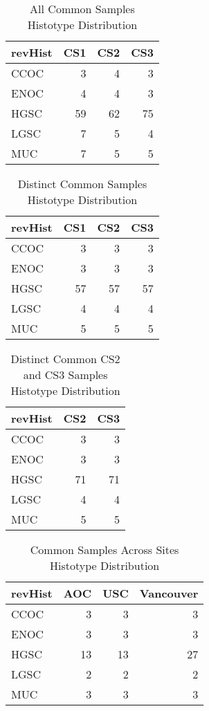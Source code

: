 \documentclass[
]{report}
\begin{document}
\begin{table}

\caption{\label{tab:common-dist-all}All Common Samples Histotype Distribution}
\centering
\begin{tabular}[t]{l|r|r|r}
\hline
revHist & CS1 & CS2 & CS3\\
\hline
CCOC & 3 & 4 & 3\\
\hline
ENOC & 4 & 4 & 3\\
\hline
HGSC & 59 & 62 & 75\\
\hline
LGSC & 7 & 5 & 4\\
\hline
MUC & 7 & 5 & 5\\
\hline
\end{tabular}
\end{table}

\begin{table}

\caption{\label{tab:common-dist-distinct}Distinct Common Samples Histotype Distribution}
\centering
\begin{tabular}[t]{l|r|r|r}
\hline
revHist & CS1 & CS2 & CS3\\
\hline
CCOC & 3 & 3 & 3\\
\hline
ENOC & 3 & 3 & 3\\
\hline
HGSC & 57 & 57 & 57\\
\hline
LGSC & 4 & 4 & 4\\
\hline
MUC & 5 & 5 & 5\\
\hline
\end{tabular}
\end{table}

\begin{table}

\caption{\label{tab:common-cs2-cs3-dist-distinct}Distinct Common CS2 and CS3 Samples Histotype Distribution}
\centering
\begin{tabular}[t]{l|r|r}
\hline
revHist & CS2 & CS3\\
\hline
CCOC & 3 & 3\\
\hline
ENOC & 3 & 3\\
\hline
HGSC & 71 & 71\\
\hline
LGSC & 4 & 4\\
\hline
MUC & 5 & 5\\
\hline
\end{tabular}
\end{table}

\begin{table}

\caption{\label{tab:common-dist-sites}Common Samples Across Sites Histotype Distribution}
\centering
\begin{tabular}[t]{l|r|r|r}
\hline
revHist & AOC & USC & Vancouver\\
\hline
CCOC & 3 & 3 & 3\\
\hline
ENOC & 3 & 3 & 3\\
\hline
HGSC & 13 & 13 & 27\\
\hline
LGSC & 2 & 2 & 2\\
\hline
MUC & 3 & 3 & 3\\
\hline
\end{tabular}
\end{table}
\end{document}
